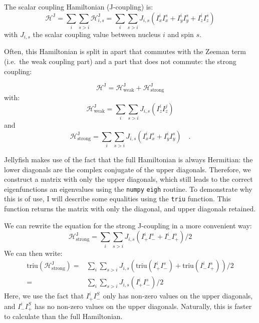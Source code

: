\documentclass[11pt,a4paper]{article}
\begin{document}
The scalar coupling Hamiltonian (J-coupling) is:
\begin{equation}
  \mathcal{H}^\text{J} = \sum_{i}\sum_{s>i}{\mathcal{H}_{i,s}^\text{J}} = 
  \sum_{i}\sum_{s>i}{J_{i,s}(I_x^i I_x^s + I_y^i I_y^s + I_z^i I_z^s)}
\end{equation}
with $J_{i,s}$ the scalar coupling value between nucleus $i$ and spin $s$.

Often, this Hamiltonian is split in apart that commutes with the Zeeman term (i.e.\ the
weak coupling part) and a part that does not commute: the strong coupling:

\begin{equation}
  \mathcal{H}^\text{J} = \mathcal{H}^\text{J}_\text{weak} +
  \mathcal{H}^\text{J}_\text{strong}
\end{equation}
with:
\begin{equation}
  \mathcal{H}^\text{J}_\text{weak} = \sum_{i}\sum_{s>i}{J_{i,s}(I_z^i I_z^j)}
\end{equation}
 and
\begin{equation}
  \mathcal{H}^\text{J}_\text{strong} = \sum_{i}\sum_{s>i}{J_{i,s}(I_x^i I_x^s + I_y^i
I_y^s)}
  \quad.
\end{equation}

Jellyfish makes use of the fact that the full Hamiltonian is always Hermitian: the lower
diagonals are the complex conjugate of the upper diagonals. Therefore, we construct a
matrix with only the upper diagonals, which still leads to the correct eigenfunctions an
eigenvalues using the \texttt{numpy} \texttt{eigh} routine. To demonstrate why this is of
use, I will describe some equalities using the \texttt{triu} function. This function returns
the matrix with only the diagonal, and upper diagonals retained.

We can rewrite the equation for the strong J-coupling in a more convenient way:
\begin{equation}
  \mathcal{H}^\text{J}_\text{strong} = \sum_{i}\sum_{s>i}{J_{i,s}(I_+^i I_-^s + I_-^i
I_+^s)/2}
\end{equation}
We can then write:
\begin{align}
\text{triu}(\mathcal{H}^\text{J}_\text{strong}) =& \sum_{i}\sum_{s>i}{J_{i,s}(\text{triu}(I_+
^i I_-^s) + \text{triu}(I_-^i I_+^s))/2} \\
=& \sum_{i}\sum_{s>i}{J_{i,s}(I_+^i I_-^s )/2}
\end{align}
Here, we use the fact that $I_+^iI_-^S$ only has non-zero values on the upper diagonals,
and $I_-^iI_+^S$ has no non-zero values on the upper diagonals. Naturally, this is faster
to calculate than the full Hamiltonian.
\end{document}
